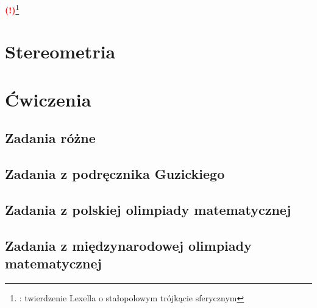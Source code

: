 \documentclass{greaseproof}
\newcommand{\todofoot}[1]{\textcolor{red}{\textbf{(!)}\footnote{\textbf{\color{red}{Do zrobienia}}: #1}}}
\begin{document}
\todofoot{twierdzenie Lexella o stałopolowym trójkącie sferycznym}

\chapter{Stereometria}


\chapter{Ćwiczenia}
\section{Zadania różne}


\section{Zadania z podręcznika Guzickiego}


\section{Zadania z polskiej olimpiady matematycznej}


\section{Zadania z międzynarodowej olimpiady matematycznej}


{}


\raggedright
{}
\printindex

\printindex[persons]
\end{document}
